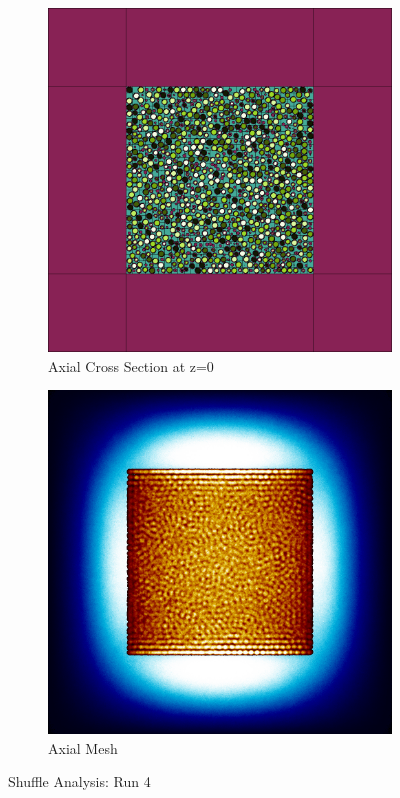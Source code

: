 \begin{figure}[H]
\begin{subfigure}{0.45\textwidth}
  \includegraphics[width=0.95\linewidth]{figures/4560123/4560123-v}
  \caption{Axial Cross Section at z=0 }
  \label{fig:4560123-v}
\end{subfigure}
%
\begin{subfigure}{0.45\textwidth}
  \includegraphics[width=0.95\linewidth]{figures/4560123/4560123-vm}
  \caption{Axial Mesh}
  \label{fig:4560123-vm}
\end{subfigure}
%
\caption{Shuffle Analysis: Run 4}
\label{fig:0-60}
\end{figure}